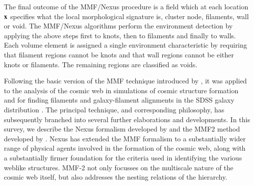 %
%
%
The final outcome of the MMF/Nexus procedure is a field which at each location $\mathbf{x}$ 
specifies what the local morphological signature is, cluster node, filaments, wall or void. 
The MMF/Nexus algorithms perform the environment detection by applying the above steps first to knots, then to filaments and 
finally to walls. Each volume element is assigned a single environment characteristic by requiring that filament regions 
cannot be knots and that wall regions cannot be either knots or filaments. The remaining regions are classified as voids.

Following the basic version of the MMF technique introduced by \cite{aragon2007}, it was applied to the analysis of the cosmic web 
in simulations of cosmic structure formation \citep{aragon2010b} and for finding filaments and galaxy-filament alignments in the SDSS galaxy 
distribution \citep{jones2010}. The principal technique, and corresponding philosophy, has subsequently branched into several 
further elaborations and developments. In this survey, we describe the Nexus formalism developed by \cite{cautun2013} and the 
MMF2 method developed by \cite{aragon2014}. Nexus has extended the MMF formalism to a substantially wider range of 
physical agents involved in the formation of the cosmic web, along with a substantially firmer foundation for the 
criteria used in identifying the various weblike structures. MMF-2 not only focusses on the multiscale nature 
of the cosmic web itself, but also addresses the nesting relations of the hierarchy. 

